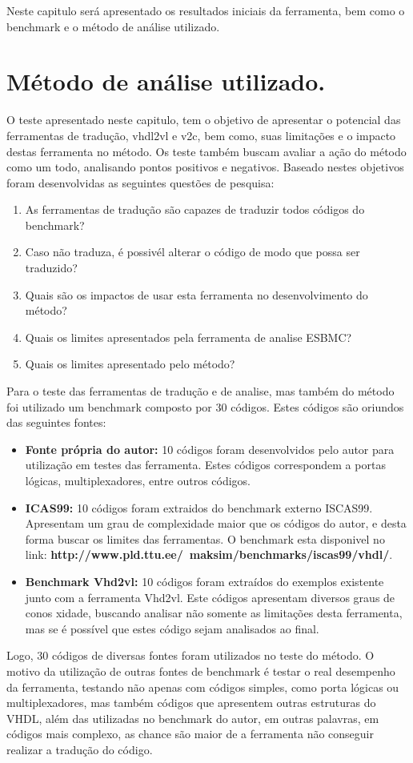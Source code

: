 \label{chapter:resultados}
\par
Neste capitulo será apresentado os resultados iniciais da ferramenta, bem como o benchmark e o método de análise utilizado.

\section{Método de análise utilizado.}
O teste apresentado neste capitulo, tem o objetivo de apresentar o potencial das ferramentas de tradução, vhdl2vl e v2c, bem como, suas limitações e o impacto destas ferramenta no método. Os teste também buscam avaliar a ação do método como um todo, analisando pontos positivos e negativos. Baseado nestes objetivos foram desenvolvidas as seguintes questões de pesquisa:
\begin{enumerate}
    \item As ferramentas de tradução são capazes de traduzir todos códigos do benchmark?
    \item Caso não traduza, é possivél alterar o código de modo que possa ser traduzido?
    \item Quais são os impactos de usar esta ferramenta no desenvolvimento do método?
    \item Quais os limites apresentados pela ferramenta de analise ESBMC?
    \item Quais os limites apresentado pelo método?
\end{enumerate}
\par
Para o teste das ferramentas de tradução e de analise, mas também do método foi utilizado um benchmark composto por 30 códigos. Estes códigos são oriundos das seguintes fontes:
\begin{itemize}
    \item \textbf{Fonte própria do autor:} 10 códigos foram desenvolvidos pelo autor para utilização em testes das ferramenta. Estes códigos correspondem a portas lógicas, multiplexadores, entre outros códigos. 
    \item \textbf{ICAS99:} 10 códigos foram extraidos do benchmark externo ISCAS99. Apresentam um grau de complexidade maior que os códigos do autor, e desta forma buscar os limites das ferramentas. O benchmark esta disponivel no link: \textbf{http://www.pld.ttu.ee/~maksim/benchmarks/iscas99/vhdl/}. 
    \item \textbf{Benchmark Vhd2vl:} 10 códigos foram extraídos do exemplos existente junto com a ferramenta Vhd2vl. Este códigos apresentam diversos graus de conos xidade, buscando analisar não somente as limitações desta ferramenta, mas se é possível que estes código sejam analisados ao final.
\end{itemize}
Logo, 30 códigos de diversas fontes foram utilizados no teste do método. O motivo da utilização de outras fontes de benchmark é testar o real desempenho da ferramenta, testando não apenas com códigos simples, como porta lógicas ou multiplexadores, mas também códigos que apresentem outras estruturas do VHDL, além das utilizadas no benchmark do autor, em outras palavras, em códigos mais complexo, as chance são maior de a ferramenta não conseguir realizar a tradução do código.


